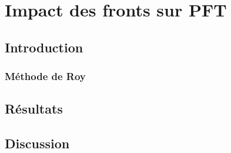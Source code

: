 
\chapter{Impact des fronts sur PFT}

\section{Introduction}

\subsection{Méthode de Roy}

\section{Résultats}

\section{Discussion}
